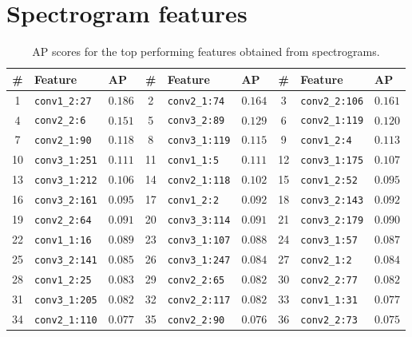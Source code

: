 \chapter{Spectrogram features}
\makeatletter{}\makeatother
\label{appen:ap_scores}
\begin{center}
\begin{longtable}{c l l | c l l | c l l }
    \caption{AP scores for the top performing features obtained from spectrograms.}
        \\ \hline
        \# & Feature & AP & \# & Feature & AP & \# & Feature & AP \\ \hline
        1 & \texttt{conv1\_2:27} & $0.186$ & 2 & \texttt{conv2\_1:74} & $0.164$ & 3 & \texttt{conv2\_2:106} & $0.161$ \\
        4 & \texttt{conv2\_2:6} & $0.151$ & 5 & \texttt{conv3\_2:89} & $0.129$ & 6 & \texttt{conv2\_1:119} & $0.120$ \\
        7 & \texttt{conv2\_1:90} & $0.118$ & 8 & \texttt{conv3\_1:119} & $0.115$ & 9 & \texttt{conv1\_2:4} & $0.113$ \\
        10 & \texttt{conv3\_1:251} & $0.111$ & 11 & \texttt{conv1\_1:5} & $0.111$ & 12 & \texttt{conv3\_1:175} & $0.107$ \\
        13 & \texttt{conv3\_1:212} & $0.106$ & 14 & \texttt{conv2\_1:118} & $0.102$ & 15 & \texttt{conv1\_2:52} & $0.095$ \\
        16 & \texttt{conv3\_2:161} & $0.095$ & 17 & \texttt{conv1\_2:2} & $0.092$ & 18 & \texttt{conv3\_2:143} & $0.092$ \\
        19 & \texttt{conv2\_2:64} & $0.091$ & 20 & \texttt{conv3\_3:114} & $0.091$ & 21 & \texttt{conv3\_2:179} & $0.090$ \\
        22 & \texttt{conv1\_1:16} & $0.089$ & 23 & \texttt{conv3\_1:107} & $0.088$ & 24 & \texttt{conv3\_1:57} & $0.087$ \\
        25 & \texttt{conv3\_2:141} & $0.085$ & 26 & \texttt{conv3\_1:247} & $0.084$ & 27 & \texttt{conv2\_1:2} & $0.084$ \\
        28 & \texttt{conv1\_2:25} & $0.083$ & 29 & \texttt{conv2\_2:65} & $0.082$ & 30 & \texttt{conv2\_2:77} & $0.082$ \\
        31 & \texttt{conv3\_1:205} & $0.082$ & 32 & \texttt{conv2\_2:117} & $0.082$ & 33 & \texttt{conv1\_1:31} & $0.077$ \\
        34 & \texttt{conv2\_1:110} & $0.077$ & 35 & \texttt{conv2\_2:90} & $0.076$ & 36 & \texttt{conv2\_2:73} & $0.075$ \\

\end{longtable}
\end{center}
